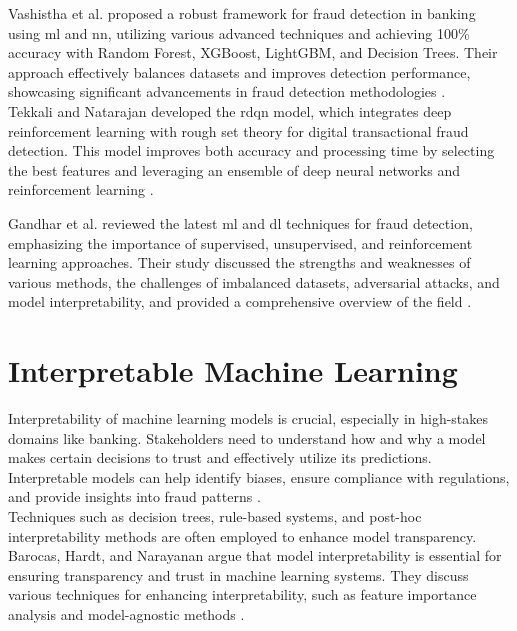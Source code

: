 \documentclass[12pt,a4paper]{report}
\begin{document}
Vashistha et al. proposed a robust framework for fraud detection in banking using \acrshort{ml} and \acrshort{nn}, utilizing various advanced techniques and achieving 100\% accuracy with Random Forest, XGBoost, LightGBM, and Decision Trees. Their approach effectively balances datasets and improves detection performance, showcasing significant advancements in fraud detection methodologies \citep[p. 201]{vashistha2024robust}.\\

Tekkali and Natarajan developed the \acrshort{rdqn} model, which integrates deep reinforcement learning with rough set theory for digital transactional fraud detection. This model improves both accuracy and processing time by selecting the best features and leveraging an ensemble of deep neural networks and reinforcement learning \citep[p. 5313]{tekkali2023rdqn}.

Gandhar et al. reviewed the latest \acrshort{ml} and \acrshort{dl} techniques for fraud detection, emphasizing the importance of supervised, unsupervised, and reinforcement learning approaches. Their study discussed the strengths and weaknesses of various methods, the challenges of imbalanced datasets, adversarial attacks, and model interpretability, and provided a comprehensive overview of the field \citep[p. 1]{gandhar2024fraud}.\\

\clearpage
\section{Interpretable Machine Learning}
Interpretability of machine learning models is crucial, especially in high-stakes domains like banking. Stakeholders need to understand how and why a model makes certain decisions to trust and effectively utilize its predictions. Interpretable models can help identify biases, ensure compliance with regulations, and provide insights into fraud patterns \citep[p.114]{barocas2023fairness}.\\

Techniques such as decision trees, rule-based systems, and post-hoc interpretability methods are often employed to enhance model transparency. Barocas, Hardt, and Narayanan argue that model interpretability is essential for ensuring transparency and trust in machine learning systems. They discuss various techniques for enhancing interpretability, such as feature importance analysis and model-agnostic methods \citep[p.114]{barocas2023fairness}.\\
\end{document}

